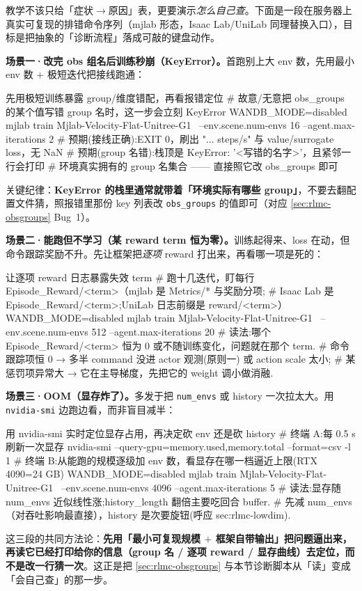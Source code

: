 \begin{practice}
教学不该只给「症状$\to$原因」表，更要演示\emph{怎么自己查}。下面是一段在服务器上真实可复现的排错命令序列（mjlab 形态，Isaac Lab/UniLab 同理替换入口），目标是把抽象的「诊断流程」落成可敲的键盘动作。

\textbf{场景一·改完 obs 组名后训练秒崩（KeyError）。}首跑别上大 env 数，先用最小 env 数 $+$ 极短迭代把接线跑通：
\begin{codebox}[bash]{先用极短训练暴露 group/维度错配，再看报错定位}
# 故意/无意把 obs_groups 的某个值写错 group 名时，这一步会立刻 KeyError
WANDB_MODE=disabled mjlab train Mjlab-Velocity-Flat-Unitree-G1 \
    --env.scene.num-envs 16 --agent.max-iterations 2
# 预期(接线正确):EXIT 0，刷出 "... steps/s" 与 value/surrogate loss，无 NaN
# 预期(group 名错):栈顶是 KeyError: '<写错的名字>'，且紧邻一行会打印
#                   环境真实拥有的 group 名集合 —— 直接照它改 obs_groups 即可
\end{codebox}
关键纪律：\textbf{KeyError 的栈里通常就带着「环境实际有哪些 group」}，不要去翻配置文件猜，照报错里那份 key 列表改 \verb|obs_groups| 的值即可（对应 \cref{sec:rlmc-obsgroups} Bug~1）。

\textbf{场景二·能跑但不学习（某 reward term 恒为零）。}训练起得来、loss 在动，但命令跟踪奖励不升。先让框架把\emph{逐项} reward 打出来，再看哪一项是死的：
\begin{codebox}[bash]{让逐项 reward 日志暴露失效 term}
# 跑十几迭代，盯每行 Episode_Reward/<term>（mjlab 是 Metrics/* 与奖励分项;
# Isaac Lab 是 Episode_Reward/<term>;UniLab 日志前缀是 reward/<term>）
WANDB_MODE=disabled mjlab train Mjlab-Velocity-Flat-Unitree-G1 \
    --env.scene.num-envs 512 --agent.max-iterations 20
# 读法:哪个 Episode_Reward/<term> 恒为 0 或不随训练变化，问题就在那个 term.
#   命令跟踪项恒 0 → 多半 command 没进 actor 观测(原则一) 或 action scale 太小;
#   某惩罚项异常大 → 它在主导梯度，先把它的 weight 调小做消融.
\end{codebox}

\textbf{场景三·OOM（显存炸了）。}多发于把 \verb|num_envs| 或 history 一次拉太大。用 \verb|nvidia-smi| 边跑边看，而非盲目减半：
\begin{codebox}[bash]{用 nvidia-smi 实时定位显存占用，再决定砍 env 还是砍 history}
# 终端 A:每 0.5 s 刷新一次显存
nvidia-smi --query-gpu=memory.used,memory.total --format=csv -l 1
# 终端 B:从能跑的规模逐级加 env 数，看显存在哪一档逼近上限(RTX 4090=24 GB)
WANDB_MODE=disabled mjlab train Mjlab-Velocity-Flat-Unitree-G1 \
    --env.scene.num-envs 4096 --agent.max-iterations 5
# 读法:显存随 num_envs 近似线性涨;history_length 翻倍主要吃回合 buffer.
#   先减 num_envs（对吞吐影响最直接），history 是次要旋钮(呼应 sec:rlmc-lowdim).
\end{codebox}
这三段的共同方法论：\textbf{先用「最小可复现规模 $+$ 框架自带输出」把问题逼出来，再读它已经打印给你的信息（group 名 / 逐项 reward / 显存曲线）去定位，而不是改一行猜一次}。这正是把 \cref{sec:rlmc-obsgroups} 与本节诊断脚本从「读」变成「会自己查」的那一步。
\end{practice}

